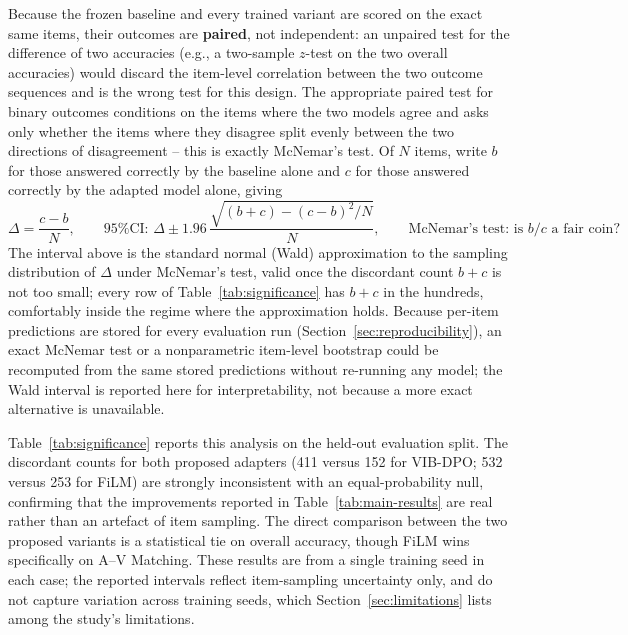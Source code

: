 \documentclass[11pt,a4paper,oneside]{article}
\begin{document}
Because the frozen baseline and every trained variant are scored on the exact same items, their
outcomes are \textbf{paired}, not independent: an unpaired test for the difference of two accuracies
(e.g., a two-sample $z$-test on the two overall accuracies) would discard the item-level correlation
between the two outcome sequences and is the wrong test for this design. The appropriate paired test
for binary outcomes conditions on the items where the two models agree and asks only whether the
items where they disagree split evenly between the two directions of disagreement -- this is exactly
McNemar's test. Of $N$ items, write $b$ for those answered correctly by the baseline alone and $c$
for those answered correctly by the adapted model alone, giving
\[
\Delta = \frac{c-b}{N}, \qquad
\text{95\% CI: } \Delta \pm 1.96\,\frac{\sqrt{(b+c)-(c-b)^2/N}}{N}, \qquad
\text{McNemar's test: is } b/c \text{ a fair coin?}
\]
The interval above is the standard normal (Wald) approximation to the sampling distribution of
$\Delta$ under McNemar's test, valid once the discordant count $b+c$ is not too small; every row of
Table~\ref{tab:significance} has $b+c$ in the hundreds, comfortably inside the regime where the
approximation holds. Because per-item predictions are stored for every evaluation run
(Section~\ref{sec:reproducibility}), an exact McNemar test or a nonparametric item-level bootstrap
could be recomputed from the same stored predictions without re-running any model; the Wald interval
is reported here for interpretability, not because a more exact alternative is unavailable.

Table~\ref{tab:significance} reports this analysis on the held-out evaluation split. The discordant
counts for both proposed adapters (411 versus 152 for VIB-DPO; 532 versus 253 for FiLM) are
strongly inconsistent with an equal-probability null, confirming that the improvements reported in
Table~\ref{tab:main-results} are real rather than an artefact of item sampling. The direct comparison
between the two proposed variants is a statistical tie on overall accuracy, though FiLM wins
specifically on A--V Matching. These results are from a single training seed in each case; the
reported intervals reflect item-sampling uncertainty only, and do not capture variation across
training seeds, which Section~\ref{sec:limitations} lists among the study's limitations.
\end{document}
